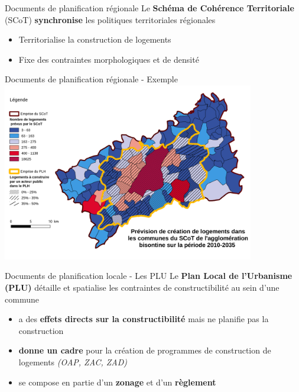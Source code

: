 \documentclass[xcolor=table]{beamer}
\begin{document}
\begin{frame}{Documents de planification régionale}
Le \textbf{Schéma de Cohérence Territoriale} (SCoT) \textbf{synchronise} les politiques territoriales régionales
\begin{itemize}
	\item Territorialise la construction de logements
	\item Fixe des contraintes morphologiques et de densité
\end{itemize}
\end{frame}

\begin{frame}{Documents de planification régionale - Exemple}
\includegraphics[width=11cm]{cartes/prevision-plh.png}
\end{frame}

\begin{frame}{Documents de planification locale - Les PLU}
Le \textbf{Plan Local de l’Urbanisme (PLU)} détaille et spatialise les contraintes de constructibilité au sein d’une commune
\begin{itemize}
\item a des \textbf{effets directs sur la constructibilité} mais ne planifie pas la construction 
\item \textbf{donne un cadre} pour la création de programmes de construction de logements \textit{(OAP, ZAC, ZAD)}
\item se compose en partie d'un \textbf{zonage} et d'un \textbf{règlement}
\end{itemize}
\end{frame}	
\end{document}
